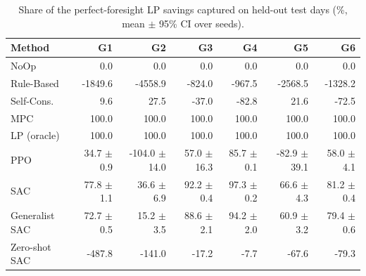\begin{table}[t]\centering\small
\caption{Share of the perfect-foresight LP savings captured on held-out test days (\%, mean $\pm$ 95\% CI over seeds).}\label{tab:capture}
\begin{tabular}{lrrrrrr}
\toprule
Method & G1 & G2 & G3 & G4 & G5 & G6 \\
\midrule
NoOp & 0.0 & 0.0 & 0.0 & 0.0 & 0.0 & 0.0 \\
Rule-Based & -1849.6 & -4558.9 & -824.0 & -967.5 & -2568.5 & -1328.2 \\
Self-Cons. & 9.6 & 27.5 & -37.0 & -82.8 & 21.6 & -72.5 \\
MPC & 100.0 & 100.0 & 100.0 & 100.0 & 100.0 & 100.0 \\
LP (oracle) & 100.0 & 100.0 & 100.0 & 100.0 & 100.0 & 100.0 \\
PPO & 34.7 $\pm$ 0.9 & -104.0 $\pm$ 14.0 & 57.0 $\pm$ 16.3 & 85.7 $\pm$ 0.1 & -82.9 $\pm$ 39.1 & 58.0 $\pm$ 4.1 \\
SAC & 77.8 $\pm$ 1.1 & 36.6 $\pm$ 6.9 & 92.2 $\pm$ 0.4 & 97.3 $\pm$ 0.2 & 66.6 $\pm$ 4.3 & 81.2 $\pm$ 0.4 \\
Generalist SAC & 72.7 $\pm$ 0.5 & 15.2 $\pm$ 3.5 & 88.6 $\pm$ 2.1 & 94.2 $\pm$ 2.0 & 60.9 $\pm$ 3.2 & 79.4 $\pm$ 0.6 \\
Zero-shot SAC & -487.8 & -141.0 & -17.2 & -7.7 & -67.6 & -79.3 \\
\midrule
\bottomrule
\end{tabular}
\end{table}